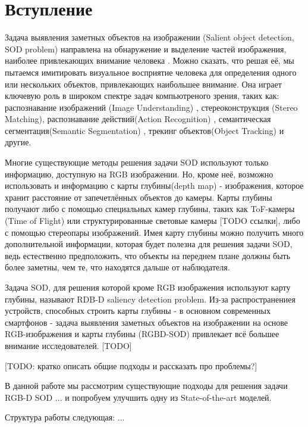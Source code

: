 \section{Вступление}

Задача выявления заметных объектов на изображении (Salient object detection, SOD problem) направлена на обнаружение и выделение частей изображения, наиболее привлекающих внимание
человека \cite{Is-Depth-Really-Necessary-for-SOD}. Можно сказать, что решая её, мы пытаемся имитировать визуальное восприятие человека для определения одного 
или нескольких объектов, привлекающих наибольшее внимание. Она играет ключевую роль в широком спектре задач компьютреного зрения, таких как:
распознавание изображений (Image Understanding) \cite{Image-Understanding}, стереоконструкция (Stereo Matching)\cite{Stereo-Matching},
распознавание действий(Action Recognition) \cite{Action-Recognition}, семантическая сегментация(Semantic Segmentation) \cite{Semantic-Segmentation-1} \cite{Semantic-Segmentation-2},
трекинг объектов(Object Tracking)\cite{Pattern-Recognition} и другие.

Многие существующие методы решения задачи SOD используют только информацию, доступную на RGB изображении.
Но, кроме неё, возможно использовать и информацию с карты глубины(depth map) - изображения, которое хранит расстояние от запечетлённых объектов до камеры.
Карты глубины получают либо с помощью специальных камер глубины, таких как ToF-камеры (Time of Flight) или структурированные световые камеры [TODO ссылки], либо с помощью
стереопары изображений. Имея карту глубины можно получить много дополнительной информации, которая будет полезна для решения задачи SOD, ведь естественно предположить, что объекты на переднем плане должны быть более заметны, 
чем те, что находятся дальше от наблюдателя.

Задача SOD, для решения которой кроме RGB изображения используют карту глубины, называют RDB-D saliency detection problem.
Из-за распространениея устройств, способных строить карты глубины - в основном современных смартфонов - задача выявления заметных объектов на изображении на основе RGB-изображения и карты глубины (RGBD-SOD) привлекает всё большее внимание исследователей. [TODO]

[TODO: кратко описать общие подходы и рассказать про проблемы?]

В данной работе мы рассмотрим существующие подходы для решения задачи RGB-D SOD ... и попробуем улучшить одну из State-of-the-art моделей.

Структура работы следующая:  ...